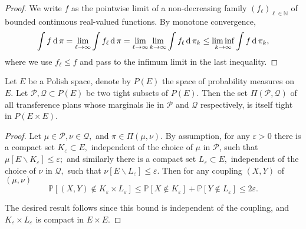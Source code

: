 \begin{proof}
	We write \( f \)  as the pointwise limit of a non-decreasing family \( \left( f _ { \ell } \right) _ { \ell \in \mathbb{ N } } \) of  bounded continuous real-valued functions.
	By monotone convergence,
	\[
		\int f \operatorname{d} \pi = \lim _ { \ell \rightarrow \infty } \int f _ { \ell } \operatorname{d} \pi = \lim _ { \ell \rightarrow \infty } \lim _ { k \rightarrow \infty } \int f _ { \ell } \operatorname{d} \pi _ { k } \leq \liminf _ { k \rightarrow \infty } \int f \operatorname{d} \pi _ { k },
	\]
	where we use $f_\ell \leq f$ and pass to the infimum limit in the last inequality.
\end{proof}

\begin{lem}
	\label{lem:tightness_transference_plan}
	Let $E$ be a Polish space, denote by $P(E)$ the space of probability measures on $E$.
	Let \( \mathcal{ P }, \mathcal{ Q } \subset P ( E ) \) be two tight subsets of \( P ( E ) \).
	Then the set \( \Pi ( \mathcal{ P } , \mathcal{ Q } ) \) of all transference plans whose marginals lie in \( \mathcal{ P } \) and \( \mathcal{ Q } \) respectively, is itself tight in \( P ( E \times E ) \).
\end{lem}

\begin{proof}
	Let \( \mu \in \mathcal{ P } , \nu \in \mathcal{ Q } , \) and \( \pi \in \Pi ( \mu , \nu ) . \) By assumption, for any \( \varepsilon > 0 \) there is a compact set \( K _ { \varepsilon } \subset E , \) independent of the choice of \( \mu \) in \( \mathcal{ P } \), such that \( \mu \left[ E \backslash K _ { \varepsilon } \right] \leq \varepsilon ; \) and similarly there is a compact set \( L _ { \varepsilon } \subset E , \) independent of the choice of \( \nu \) in \( \mathcal{ Q } , \) such that \( \nu \left[ E \backslash L _ { \varepsilon } \right] \leq \varepsilon . \) Then for any coupling \( ( X , Y ) \) of \( ( \mu , \nu ) \)
	\[ \mathbb{ P } \left[ ( X , Y ) \notin K _ { \varepsilon } \times L _ { \varepsilon } \right] \leq \mathbb{ P } \left[ X \notin K _ { \varepsilon } \right] + \mathbb{ P } \left[ Y \notin L _ { \varepsilon } \right] \leq 2 \varepsilon. \]

	The desired result follows since this bound is independent of the coupling, and \( K _ { \varepsilon } \times L _ { \varepsilon } \) is compact in \( E \times E  \).
\end{proof}

